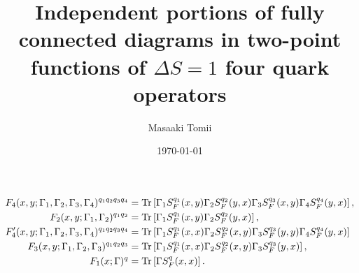 \documentclass[11pt,dvipdfmx]{article}
\title{Independent portions of fully connected diagrams in two-point functions of $\Delta S=1$ four quark operators}
\author{Masaaki Tomii}
\date{\today}
\newcommand{\1}{\mbox{1}\hspace{-0.25em}\mbox{l}}
\newcommand{\Tr}{{\rm{Tr}}}
\begin{document}

\begin{align}
F_4(x,y;\Gamma_1,\Gamma_2,\Gamma_3,\Gamma_4)^{q_1q_2q_3q_4}
&= \Tr\left[
\Gamma_1S_F^{q_1}(x,y)
\Gamma_2S_F^{q_2}(y,x)
\Gamma_3S_F^{q_3}(x,y)
\Gamma_4S_F^{q_4}(y,x)
\right],
\\
F_2(x,y;\Gamma_1,\Gamma_2)^{q_1q_2}
&= \Tr\left[
\Gamma_1S_F^{q_1}(x,y)
\Gamma_2S_F^{q_2}(y,x)
\right],
\\
F_4'(x,y;\Gamma_1,\Gamma_2,\Gamma_3,\Gamma_4)^{q_1q_2q_3q_4}
&= \Tr\left[
\Gamma_1S_F^{q_1}(x,x)
\Gamma_2S_F^{q_2}(x,y)
\Gamma_3S_F^{q_3}(y,y)
\Gamma_4S_F^{q_4}(y,x)
\right]
\\
F_3(x,y;\Gamma_1,\Gamma_2,\Gamma_3)^{q_1q_2q_3}
&= \Tr\left[
\Gamma_1S_F^{q_1}(x,x)
\Gamma_2S_F^{q_2}(x,y)
\Gamma_3S_F^{q_3}(y,x)
\right],
\\
F_1(x;\Gamma)^q
&= \Tr\left[
\Gamma S_F^q(x,x)
\right].
\end{align}



\end{document}
